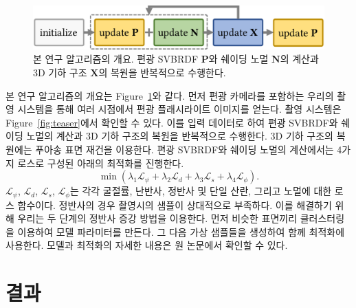 \documentclass[a4paper,twocolumn]{article}
\begin{document}
\begin{figure}[tpb]
	\vspace{-2mm}%
	\centering%
	\footnotesize%
	\includegraphics[width=1.0\linewidth]{fig/pipeline-workflow}%
	\vspace{-3mm}%
	\caption{\label{fig:workflow}%
		본 연구 알고리즘의 개요. 편광 SVBRDF $\mathbf{P}$와 쉐이딩 노멀 $\mathbf{N}$의 계산과 3D 기하 구조 $\mathbf{X}$의 복원을 반복적으로 수행한다.
	}
	\vspace{-2mm}
\end{figure}
본 연구 알고리즘의 개요는 Figure~\ref{fig:workflow}와 같다. 먼저 편광 카메라를 포함하는 우리의 촬영 시스템을 통해 여러 시점에서 편광 플래시라이트 이미지를 얻는다. 촬영 시스템은 Figure~\ref{fig:teaser}에서 확인할 수 있다.
이를 입력 데이터로 하여 편광 SVBRDF와 쉐이딩 노멀의 계산과 3D 기하 구조의 복원을 반복적으로 수행한다. 
3D 기하 구조의 복원에는 푸아송 표면 재건을\cite{kazhdan2013screened} 이용한다.
편광 SVBRDF와 쉐이딩 노멀의 계산에서는 4가지 로스로 구성된 아래의 최적화를 진행한다.
\begin{equation}
	\label{eq:optimization}
	{\min}\left( {{\lambda }_{1}}{{\mathcal{L}}_{\psi}}+{{\lambda }_{2}}{{\mathcal{L}}_{d}}+{{\lambda }_{3}}{{\mathcal{L}}_{s}}+{{\lambda }_{4}}{{\mathcal{L}}_{\phi}} \right).
\end{equation}
%
${{\mathcal{L}}_{\psi}}$, ${{\mathcal{L}}_{d}}$, ${{\mathcal{L}}_{s}}$, ${{\mathcal{L}}_{\phi}}$는 각각 굴절률, 난반사, 정반사 및 단일 산란, 그리고 노멀에 대한 로스 함수이다.
정반사의 경우 촬영시의 샘플이 상대적으로 부족하다. 이를 해결하기 위해 우리는 두 단계의 정반사 증강 방법을 이용한다.
먼저 비슷한 표면끼리 클러스터링을 이용하여 모델 파라미터를 만든다. 그 다음 가상 샘플들을 생성하여 함께 최적화에 사용한다.
모델과 최적화의 자세한 내용은 원 논문에서 확인할 수 있다.


\section{결과}
\label{sec:results}
\end{document}

